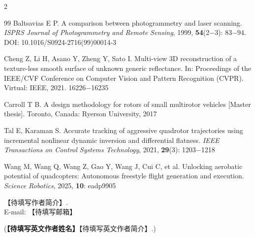 \documentclass{aas}
\begin{document}
\begin{multicols}{2}
\begin{thebibliography}{99}
 Baltsavias E P. A comparison between photogrammetry and laser scanning. {\sl ISPRS Journal of Photogrammetry and Remote Sensing}, 1999, {\bf 54}(2$-$3): 83$-$94. DOI: 10.1016/S0924-2716(99)00014-3

 Cheng Z, Li H, Asano Y, Zheng Y, Sato I. Multi-view 3D reconstruction of a texture-less smooth surface of unknown generic reflectance. In: Proceedings of the IEEE/CVF Conference on Computer Vision and Pattern Recognition (CVPR). Virtual: IEEE, 2021. 16226$-$16235

 Carroll T B. A design methodology for rotors of small multirotor vehicles [Master thesis]. Toronto, Canada: Ryerson University, 2017

 Tal E, Karaman S. Accurate tracking of aggressive quadrotor trajectories using incremental nonlinear dynamic inversion and differential flatness. {\sl IEEE Transactions on Control Systems Technology}, 2021, {\bf 29}(3): 1203$-$1218

 Wang M, Wang Q, Wang Z, Gao Y, Wang J, Cui C, et al. Unlocking aerobatic potential of quadcopters: Autonomous freestyle flight generation and execution. {\sl Science Robotics}, 2025, {\bf 10}: eadp9905

\end{thebibliography}

\begin{biographynophoto}
\quad 【待填写作者简介】.\\E-mail: 【待填写邮箱】

\noindent({\bf 【待填写英文作者姓名】}\quad 【待填写英文作者简介】.)
\end{biographynophoto}

\end{multicols}
\end{document}
